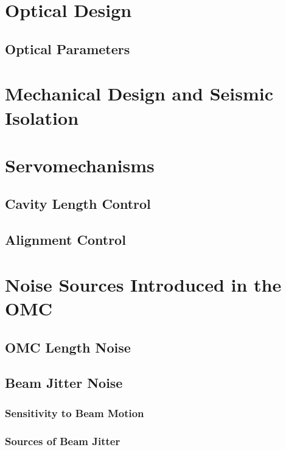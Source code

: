 \documentclass[12pt,vi,twoside]{mitthesis}
\begin{document}
\section{Optical Design}
\subsection{Optical Parameters}
\section{Mechanical Design and Seismic Isolation}
\section{Servomechanisms}
\subsection{Cavity Length Control}
\subsection{Alignment Control}
\section{Noise Sources Introduced in the OMC}
\subsection{OMC Length Noise}
\subsection{Beam Jitter Noise}
\subsubsection{Sensitivity to Beam Motion}
\subsubsection{Sources of Beam Jitter}

\appendix



\end{document}
